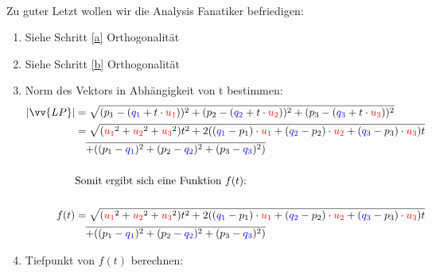             \paragraph{} Zu guter Letzt wollen wir die Analysis Fanatiker befriedigen:
                \begin{enumerate}[1)]
                    \item Siehe Schritt \ref{a} Orthogonalität
                    \item Siehe Schritt \ref{b} Orthogonalität
                    \item Norm des Vektors in Abhängigkeit von t bestimmen:
                    \begin{align*}
                        |\vv{LP}| &= \sqrt{(p_1 - (\textcolor{blue}{q_1} + t \cdot \textcolor{red}{u_1}))^2 + (p_2 - (\textcolor{blue}{q_2} + t \cdot \textcolor{red}{u_2}))^2 + (p_3 - (\textcolor{blue}{q_3} + t\cdot \textcolor{red}{u_3}))^2} \\
                                  &= \sqrt{(\textcolor{red}{u_1}^2 + \textcolor{red}{u_2}^2 + \textcolor{red}{u_3}^2)t^2 + 2((\textcolor{blue}{q_1} - p_1) \cdot \textcolor{red}{u_1} + (\textcolor{blue}{q_2} - p_2) \cdot \textcolor{red}{u_2} + (\textcolor{blue}{q_3} - p_3) \cdot \textcolor{red}{u_3})t} \\
                                  & \quad \overline{+ ((p_1 - \textcolor{blue}{q_1})^2 + (p_2 - \textcolor{blue}{q_2})^2 + (p_3 - \textcolor{blue}{q_3})^2)}
                                  \\\\
                        & \text{Somit ergibt sich eine Funktion $f(t)$:} \\\\
                             f(t) &= \sqrt{(\textcolor{red}{u_1}^2 + \textcolor{red}{u_2}^2 + \textcolor{red}{u_3}^2)t^2 + 2((\textcolor{blue}{q_1} - p_1) \cdot \textcolor{red}{u_1} + (\textcolor{blue}{q_2} - p_2) \cdot \textcolor{red}{u_2} + (\textcolor{blue}{q_3} - p_3) \cdot \textcolor{red}{u_3})t} \\
                                  & \quad \overline{+ ((p_1 - \textcolor{blue}{q_1})^2 + (p_2 - \textcolor{blue}{q_2})^2 + (p_3 - \textcolor{blue}{q_3})^2)}
                    \end{align*}
                    \item Tiefpunkt von $f(t)$ berechnen:
                    \\\\
                    \begin{align*}

\end{align*}
\end{enumerate}
